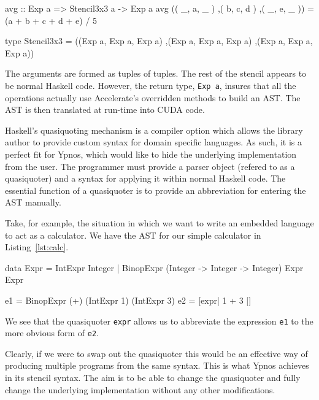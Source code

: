 \documentclass[12pt,a4paper,twoside]{scrbook}
\begin{document}
\begin{hflisting}[label={lst:ypsten}, caption=The ``average'' stencil defined
  using Accelerate's syntax.]
avg :: Exp a => Stencil3x3 a -> Exp a
avg (( _, a, _ )
    ,( b, c, d )
    ,( _, e, _ )) = (a + b + c + d + e) / 5

type Stencil3x3 = ((Exp a, Exp a, Exp a)
                  ,(Exp a, Exp a, Exp a)
                  ,(Exp a, Exp a, Exp a))
\end{hflisting}

The arguments are formed as tuples of tuples. The rest of the stencil appears to
be normal Haskell code. However, the return type, \texttt{Exp a}, insures that
all the operations actually use Accelerate's overridden methods to build an
AST. The AST is then translated at run-time into CUDA code.

Haskell's quasiquoting mechanism is a compiler option which allows the library
author to provide custom syntax for domain specific languages.  As such, it is a
perfect fit for Ypnos, which would like to hide the underlying implementation
from the user. The programmer must provide a parser object (refered to as a
quasiquoter) and a syntax for applying it within normal Haskell code. The
essential function of a quasiquoter is to provide an abbreviation for entering
the AST manually.

Take, for example, the situation in which we want to write an embedded
language to act as a calculator. We have the AST for our
simple calculator in Listing~\ref{lst:calc}.

\begin{hflisting}[label={lst:calc}, caption={A simple calculator defined using an
  AST (\texttt{Expr}) and using a quasiquoter for abbreviated syntax. The definition of
  \texttt{expr} is omitted.}]
data Expr  =  IntExpr Integer
           |  BinopExpr (Integer -> Integer -> Integer) Expr Expr

e1 = BinopExpr (+) (IntExpr 1) (IntExpr 3)
e2 = [expr| 1 + 3 |]
\end{hflisting}

We see that the quasiquoter \texttt{expr} allows us to abbreviate the expression
\texttt{e1} to the more obvious form of \texttt{e2}.

Clearly, if we were to swap out the quasiquoter this would be an
effective way of producing multiple programs from the same syntax. This
is what Ypnos achieves in its stencil syntax. The aim is to be able to
change the quasiquoter and fully change the underlying implementation
without any other modifications.
\end{document}
